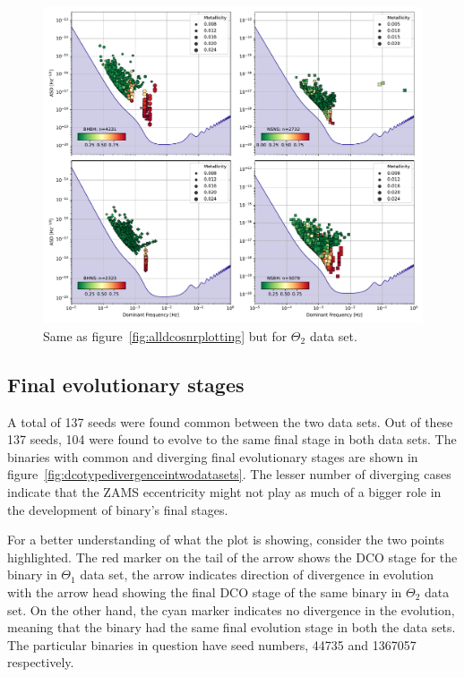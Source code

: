 \documentclass[twocolumn, twocolappendix]{aastex63}
\begin{document}
\begin{figure}[h]%
	\centering
	\includegraphics[width=\columnwidth]{analysis_data/004__images_for_latex/dco_typewise_snr0e}
	\caption{Same as figure~\ref{fig:alldcosnrplotting} but for $\Theta_2$ data set.}
	\label{fig:dcotypewisesnr0e}
\end{figure}%

\subsection{Final evolutionary stages}
\label{subsec:finalevolutionarystages}
A total of 137 seeds were found common between the two data sets.
Out of these 137 seeds, 104 were found to evolve to the same final stage in both data sets.
The binaries with common and diverging final evolutionary stages are shown in figure~\ref{fig:dcotypedivergenceintwodatasets}.
The lesser number of diverging cases indicate that the ZAMS eccentricity might not play as much of a bigger role in the development of binary's final stages.

For a better understanding of what the plot is showing, consider the two points highlighted.
The red marker on the tail of the arrow shows the DCO stage for the binary in $\Theta_1$ data set, the arrow indicates direction of divergence in evolution with the arrow head showing the final DCO stage of the same binary in $\Theta_2$ data set.
On the other hand, the cyan marker indicates no divergence in the evolution, meaning that the binary had the same final evolution stage in both the data sets.
The particular binaries in question have seed numbers, 44735 and 1367057 respectively.
\end{document}
